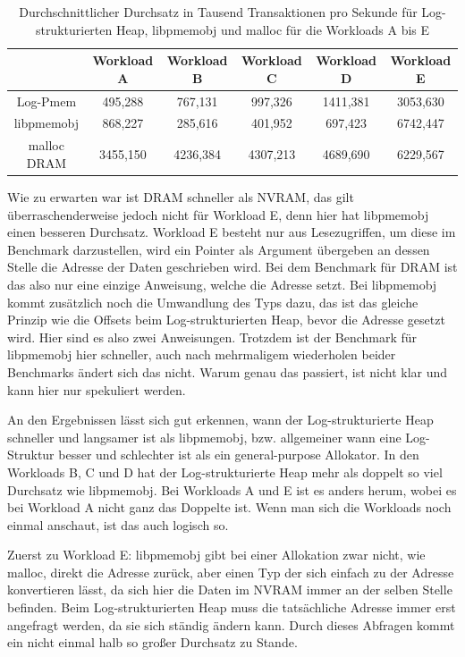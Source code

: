 \documentclass{class/thesis}
\begin{document}
\begin{thesis}
	\begin{table}[H]
		\begin{center}
			\begin{tabular}{c | c | c | c | c | c}
				& Workload A & Workload B & Workload C & Workload D & Workload E \\ \hline
				Log-Pmem & 495,288 & 767,131 & 997,326 & 1411,381 & 3053,630 \\
				libpmemobj & 868,227 & 285,616 & 401,952 & 697,423 & 6742,447 \\
				malloc DRAM & 3455,150 & 4236,384 & 4307,213 & 4689,690 & 6229,567
			\end{tabular}
		\end{center}
		\caption{Durchschnittlicher Durchsatz in Tausend Transaktionen pro Sekunde für Log-strukturierten Heap, libpmemobj und malloc für die Workloads A bis E}
		\label{ergebnisseTabelle}
	\end{table}
	
	Wie zu erwarten war ist DRAM schneller als NVRAM, das gilt überraschenderweise jedoch nicht für Workload E, denn hier hat libpmemobj einen besseren Durchsatz. 
	Workload E besteht nur aus Lesezugriffen, um diese im Benchmark darzustellen, wird ein Pointer als Argument übergeben an dessen Stelle die Adresse der Daten geschrieben wird.
	Bei dem Benchmark für DRAM ist das also nur eine einzige Anweisung, welche die Adresse setzt.
	Bei libpmemobj kommt zusätzlich noch die Umwandlung des Typs  dazu, das ist das gleiche Prinzip wie die Offsets beim Log-strukturierten Heap, bevor die Adresse gesetzt wird. Hier sind es also zwei Anweisungen.
	Trotzdem ist der Benchmark für libpmemobj hier schneller, auch nach mehrmaligem wiederholen beider Benchmarks ändert sich das nicht.
	Warum genau das passiert, ist nicht klar und kann hier nur spekuliert werden.
	
	An den Ergebnissen lässt sich gut erkennen, wann der Log-strukturierte Heap schneller und langsamer ist als libpmemobj, bzw. allgemeiner wann eine Log-Struktur besser und schlechter ist als ein general-purpose Allokator.
	In den Workloads B, C und D hat der Log-strukturierte Heap mehr als doppelt so viel Durchsatz wie libpmemobj. 
	Bei Workloads A und E ist es anders herum, wobei es bei Workload A nicht ganz das Doppelte ist.
	Wenn man sich die Workloads noch einmal anschaut, ist das auch logisch so.
	
	Zuerst zu Workload E: libpmemobj gibt bei einer Allokation zwar nicht, wie malloc, direkt die Adresse zurück, aber einen Typ der sich einfach zu der Adresse konvertieren lässt, da sich hier die Daten im NVRAM immer an der selben Stelle befinden.
	Beim Log-strukturierten Heap muss die tatsächliche Adresse immer erst angefragt werden, da sie sich ständig ändern kann.
	Durch dieses Abfragen kommt ein nicht einmal halb so großer Durchsatz zu Stande.
	

\end{thesis}
\end{document}
